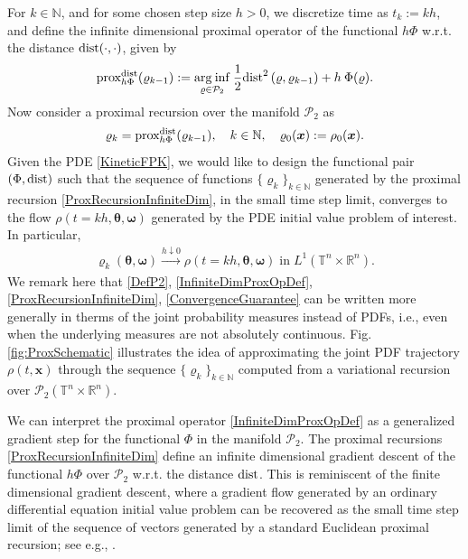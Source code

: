 \documentclass[10pt,twocolumn]{IEEEtran}
\begin{document}
For $k\in\mathbb{N}$, and for some chosen step size $h>0$, we discretize time as $t_{k} := kh$, and define the infinite dimensional proximal operator of the functional $h\Phi$ w.r.t. the distance ${\rm{dist}}(\cdot,\cdot)$, given by
\begin{eqnarray}
{\text{prox}}^{{\rm{dist}}}_{h\Phi}(\varrho_{k-1}) := \underset{\varrho\in\mathcal{P}_{2}} {{\rm{arg\:inf}}}\: \frac{1}{2} {\rm{dist}}^{2}\left(\varrho,\varrho_{k-1}\right) + h\: \Phi(\varrho).
\label{InfiniteDimProxOpDef}
\end{eqnarray}
Now consider a proximal recursion over the manifold $\mathcal{P}_{2}$ as
\begin{eqnarray}
\varrho_{k} = {\text{prox}}^{{\rm{dist}}}_{h\Phi}(\varrho_{k-1}), \quad k\in\mathbb{N}, \quad \varrho_{0}(\bm{x}) := \rho_{0}(\bm{x}).
\label{ProxRecursionInfiniteDim}	
\end{eqnarray}
Given the PDE \eqref{KineticFPK}, we would like to design the functional pair $\left(\Phi,{\rm{dist}}\right)$ such that the sequence of functions $\{\varrho_{k}\}_{k\in\mathbb{N}}$ generated by the proximal recursion \eqref{ProxRecursionInfiniteDim}, in the small time step limit, converges to the flow $\rho(t=kh,\bm{\theta},\bm{\omega})$ generated by the PDE initial value problem of interest. In particular,
\begin{align}
\varrho_{k}(\bm{\theta},\bm{\omega}) \xrightarrow{h\downarrow 0} \rho(t=kh,\bm{\theta},\bm{\omega}) \;\text{in}\;L^{1}\left(\mathbb{T}^{n} \times \mathbb{R}^{n}\right).
\label{ConvergenceGuarantee}	
\end{align}
We remark here that \eqref{DefP2}, \eqref{InfiniteDimProxOpDef}, \eqref{ProxRecursionInfiniteDim}, \eqref{ConvergenceGuarantee} can be written more generally in therms of the joint probability measures instead of PDFs, i.e., even when the underlying measures are not absolutely continuous. Fig. \ref{fig:ProxSchematic} illustrates the idea of approximating the joint PDF trajectory $\rho(t,\bm{x})$ through the sequence $\{\varrho_{k}\}_{k\in\mathbb{N}}$ computed from a variational recursion over $\mathcal{P}_{2}\left(\mathbb{T}^{n}\times\mathbb{R}^{n}\right)$.

We can interpret the proximal operator \eqref{InfiniteDimProxOpDef} as a generalized gradient step for the functional $\Phi$ in the manifold $\mathcal{P}_{2}$. The proximal recursions \eqref{ProxRecursionInfiniteDim} define an infinite dimensional gradient descent of the functional $h\Phi$ over $\mathcal{P}_{2}$ w.r.t. the distance ${\rm{dist}}$. This is reminiscent of the finite dimensional gradient descent, where a gradient flow generated by an ordinary differential equation initial value problem can be recovered as the small time step limit of the sequence of vectors generated by a standard Euclidean proximal recursion; see e.g., \cite[Sec. I]{caluya2019TAC}.
\end{document}
